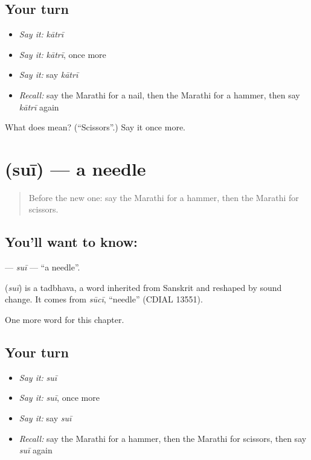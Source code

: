 \subsection*{Your turn}
\begin{itemize}
\raggedright
  \item \emph{Say it:} \emph{kātrī}
  \item \emph{Say it:} \emph{kātrī}, once more
  \item \emph{Say it:} say \emph{kātrī}
  \item \emph{Recall:} say the Marathi for a nail, then the Marathi for a hammer, then say \emph{kātrī} again
\end{itemize}

\begin{tcolorbox}[breakable,colback=teal!4,colframe=teal!35!black,title={Before you move on}]
What does  mean? (\textquotedblleft{}Scissors\textquotedblright{}.) Say it once more.
\end{tcolorbox}
\section[\texorpdfstring{\mr{सुई} (suī)}{सुई (suī)}]{ (suī) — a needle}

\label{lesson:MR-C132-sui}



\begin{quote}
Before the new one: say the Marathi for a hammer, then the Marathi for scissors.
\end{quote}

\subsection*{You'll want to know: }
\textbf{} — \emph{suī} — \textquotedblleft{}a needle\textquotedblright{}.

\begin{cousinweb}
\textbf{} (\emph{suī}) is a tadbhava, a word inherited from Sanskrit and reshaped by sound change. It comes from \emph{sūcī}, \textquotedblleft{}needle\textquotedblright{} (CDIAL 13551).
\end{cousinweb}

\begin{grammarlens}[title={What you've built}]
One more word for this chapter.
\end{grammarlens}

\subsection*{Your turn}
\begin{itemize}
\raggedright
  \item \emph{Say it:} \emph{suī}
  \item \emph{Say it:} \emph{suī}, once more
  \item \emph{Say it:} say \emph{suī}
  \item \emph{Recall:} say the Marathi for a hammer, then the Marathi for scissors, then say \emph{suī} again
\end{itemize}


